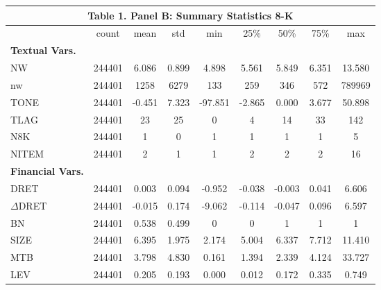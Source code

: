 \begin{table}[htbp] \label{T1PB}
  \centering
    \begin{tabular}{lcccccccc}
    \multicolumn{9}{c}{\textbf{Table 1. Panel B: Summary Statistics 8-K}} \\
    \midrule
      & count & mean & std & min & 25\% & 50\% & 75\% & max \\
    \midrule
    \textbf{Textual Vars.} &   &   &   &   &   &   &   &  \\
    NW & 244401 & 6.086 & 0.899 & 4.898 & 5.561 & 5.849 & 6.351 & 13.580 \\
    nw & 244401 & 1258 & 6279 & 133 & 259 & 346 & 572 & 789969 \\
    TONE & 244401 & -0.451 & 7.323 & -97.851 & -2.865 & 0.000 & 3.677 & 50.898 \\
    TLAG & 244401 & 23 & 25 & 0 & 4 & 14 & 33 & 142 \\
    N8K & 244401 & 1 & 0 & 1 & 1 & 1 & 1 & 5 \\
    NITEM & 244401 & 2 & 1 & 1 & 2 & 2 & 2 & 16 \\
    \textbf{Financial Vars.} &   &   &   &   &   &   &   &  \\
    DRET & 244401 & 0.003 & 0.094 & -0.952 & -0.038 & -0.003 & 0.041 & 6.606 \\
    $\Delta$DRET & 244401 & -0.015 & 0.174 & -9.062 & -0.114 & -0.047 & 0.096 & 6.597 \\
    BN & 244401 & 0.538 & 0.499 & 0 & 0 & 1 & 1 & 1 \\
    SIZE & 244401 & 6.395 & 1.975 & 2.174 & 5.004 & 6.337 & 7.712 & 11.410 \\
    MTB & 244401 & 3.798 & 4.830 & 0.161 & 1.394 & 2.339 & 4.124 & 33.727 \\
    LEV & 244401 & 0.205 & 0.193 & 0.000 & 0.012 & 0.172 & 0.335 & 0.749 \\
    \bottomrule
    \end{tabular}%
\end{table}%
